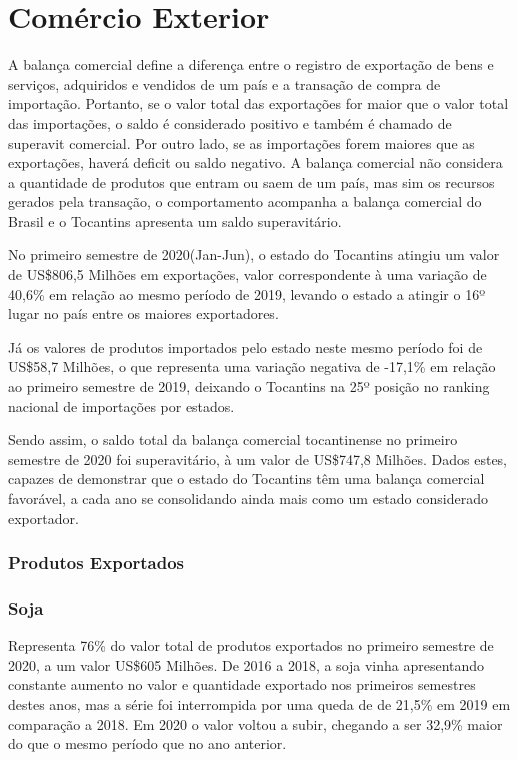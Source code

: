 \chapter{Comércio Exterior}

\par A balança comercial define a diferença entre o registro de exportação de bens e serviços, adquiridos e vendidos de um país e a transação de compra de importação. Portanto, se o valor total das exportações for maior que o valor total das importações, o saldo é considerado positivo e também é chamado de superavit comercial. Por outro lado, se as importações forem maiores que as exportações, haverá deficit ou saldo negativo. A balança comercial não considera a quantidade de produtos que entram ou saem de um país, mas sim os recursos gerados pela transação, o comportamento acompanha a balança comercial do Brasil e o Tocantins apresenta um saldo superavitário.


\par No primeiro semestre de 2020(Jan-Jun), o estado do Tocantins atingiu um valor de US\$806,5 Milhões em exportações, valor correspondente à uma variação de 40,6\% em relação ao mesmo período de 2019, levando o estado a atingir o 16º lugar no país entre os maiores exportadores. 

\par Já os valores de produtos importados pelo estado neste mesmo período foi de US\$58,7 Milhões, o que representa uma variação negativa de -17,1\% em relação ao primeiro semestre de 2019, deixando o Tocantins na 25º posição no ranking nacional de importações por estados.

\par Sendo assim, o saldo total da balança comercial tocantinense no primeiro semestre de 2020 foi superavitário, à um valor de US\$747,8 Milhões. Dados estes, capazes de demonstrar que o estado do Tocantins têm uma balança comercial favorável, a cada ano se consolidando ainda mais como um estado considerado exportador.

\subsection{Produtos Exportados}
\subsection{Soja}

\par Representa 76\% do valor total de produtos exportados no primeiro semestre de 2020, a um valor US\$605 Milhões. De 2016 a 2018, a soja vinha apresentando constante aumento no valor e quantidade exportado nos primeiros semestres destes anos, mas a série foi interrompida por uma queda de de 21,5\% em 2019 em comparação a 2018. Em 2020 o valor voltou a subir, chegando a ser 32,9\% maior do que o mesmo período que no ano anterior.

